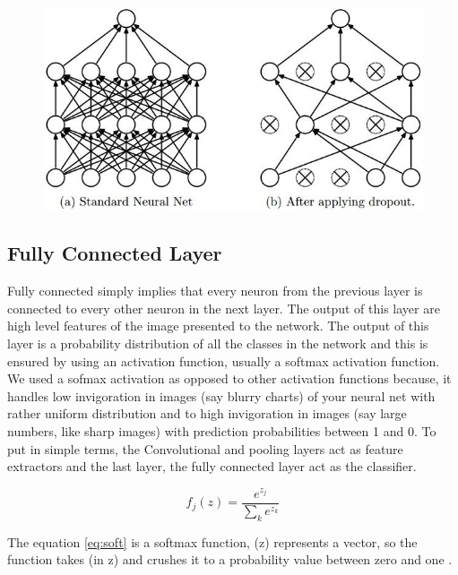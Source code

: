 \documentclass[12pt, a4paper,oneside]{report}
\begin{document}
\begin{figure}[!htb]
	\includegraphics [scale=0.6] {dropout}
	
	\label{fig:dropout}
\end{figure}


\subsection{Fully Connected Layer}
Fully connected simply implies that every neuron from the previous layer is connected to every other neuron in the next layer. The output of this layer are high level features of the image presented to the network. The output of this layer is a probability distribution of all the classes in the network and this is ensured by using an activation function, usually a softmax activation function. We used a sofmax activation as opposed to other activation functions because, it handles low invigoration
in images (say blurry charts) of your neural net with rather uniform distribution and to high invigoration in images (say large numbers, like sharp images) with prediction probabilities between 1 and 0. To put in simple terms, the Convolutional and pooling layers act as feature extractors and the last layer, the fully connected layer act as the classifier.

\begin{equation} \label{eq:soft}
f_j(z) = \frac{e^{z_j}}{\sum_k e^{z_k}}
\end{equation}

The equation \ref{eq:soft} is a softmax function, (z) represents a vector, so the function takes (in z) and crushes it to a probability value between zero and one \cite{softmax}.
\end{document}
